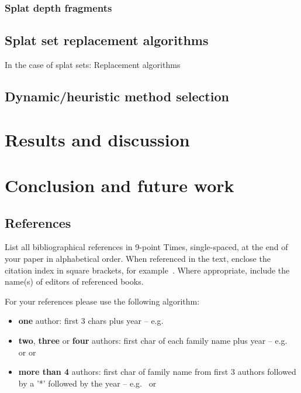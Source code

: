 \subsubsection{Splat depth fragments}



\subsection{Splat set replacement algorithms}
\label{sec:proxyModelReplacement}

In the case of splat sets: Replacement algorithms

\subsection{Dynamic/heuristic method selection}


\section{Results and discussion}


\section{Conclusion and future work}



\subsection{References}

List all bibliographical references in 9-point Times, single-spaced, at the
end of your paper in alphabetical order. When referenced in the text, enclose
the citation index in square brackets, for example~\cite{Lous90}. Where
appropriate, include the name(s) of editors of referenced books.

For your references please use the following algorithm:
\begin{itemize} 
\item \textbf{one} author: first 3 chars plus year -- 
      e.g.\ \cite{Lous90}
\item \textbf{two}, \textbf{three} or \textbf{four} authors: first char
      of each family name plus year --  e.g.\ \cite{Fellner-Helmberg93} 
      or \cite{Kobbelt97-USHDR} or \cite{Lafortune97-NARF}
\item \textbf{more than 4} authors: first char of family name from 
      first 3 authors followed by a '*' followed by the year -- 
      e.g.\ \cite{Buhmann:1998:DCQ} or \cite{FolDamFeiHug.etal93} 
\end{itemize}

